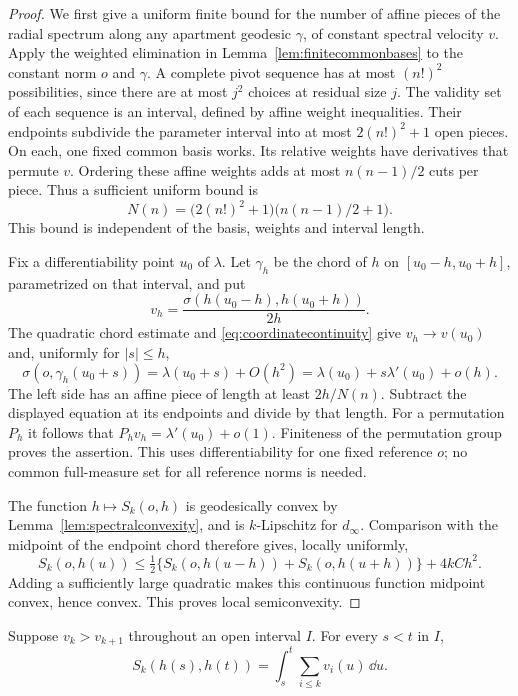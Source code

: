 \begin{proof}
We first give a uniform finite bound for the number of affine
pieces of the radial spectrum along any apartment geodesic
$\gamma$, of constant spectral velocity $v$. Apply the weighted
elimination in Lemma~\ref{lem:finitecommonbases} to the constant
norm $o$ and $\gamma$. A complete pivot sequence has at most
$(n!)^2$ possibilities, since there are at most $j^2$ choices at
residual size $j$. The validity set of each sequence is an interval,
defined by affine weight inequalities. Their endpoints subdivide
the parameter interval into at most $2(n!)^2+1$ open pieces.
On each, one fixed common basis works. Its relative weights have
derivatives that permute $v$. Ordering these affine weights adds
at most $n(n-1)/2$ cuts per piece. Thus a sufficient uniform bound is
\[
 N(n)=\bigl(2(n!)^2+1\bigr)\bigl(n(n-1)/2+1\bigr).
\]
This bound is independent of the basis, weights and interval length.

Fix a differentiability point $u_0$ of $\lambda$. Let $\gamma_h$
be the chord of $h$ on $[u_0-h,u_0+h]$, parametrized on that
interval, and put
\[
 v_h=\frac{\sigma(h(u_0-h),h(u_0+h))}{2h}.
\]
The quadratic chord estimate and
\eqref{eq:coordinatecontinuity} give $v_h\to v(u_0)$ and,
uniformly for $|s|\le h$,
\[
 \sigma(o,\gamma_h(u_0+s))
 =\lambda(u_0+s)+O(h^2)
 =\lambda(u_0)+s\lambda'(u_0)+o(h).
\]
The left side has an affine piece of length at least $2h/N(n)$.
Subtract the displayed equation at its endpoints and divide by
that length. For a permutation $P_h$ it follows that
$P_hv_h=\lambda'(u_0)+o(1)$. Finiteness of the permutation group
proves the assertion. This uses differentiability for one fixed
reference $o$; no common full-measure set for all reference norms
is needed.

The function $h\mapsto S_k(o,h)$ is geodesically convex by
Lemma~\ref{lem:spectralconvexity}, and is $k$-Lipschitz for
$d_\infty$. Comparison with the midpoint of the endpoint chord
therefore gives, locally uniformly,
\[
 S_k(o,h(u))\le\tfrac12\{S_k(o,h(u-h))+S_k(o,h(u+h))\}
                         +4kCh^2.
\]
Adding a sufficiently large quadratic makes this continuous
function midpoint convex, hence convex. This proves local
semiconvexity.
\end{proof}

\begin{lemma}\label{lem:topsaturation}
Suppose $v_k>v_{k+1}$ throughout an open interval $I$.
For every $s<t$ in $I$,
\begin{equation}\label{eq:topsaturation}
 S_k(h(s),h(t))=\int_s^t\sum_{i\le k}v_i(u)\,\dd u.
\end{equation}
\end{lemma}


